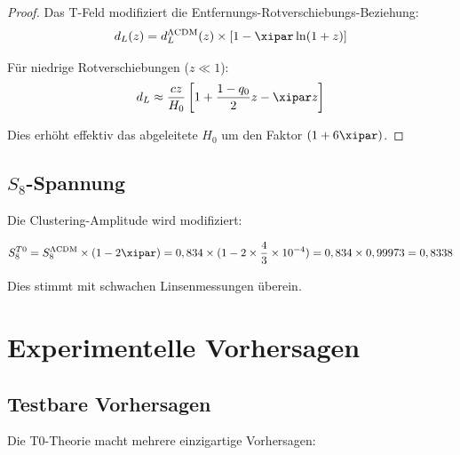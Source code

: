 	\begin{proof}
		Das T-Feld modifiziert die Entfernungs-Rotverschiebungs-Beziehung:
		\begin{equation}
			d_L(z) = d_L^{\Lambda\text{CDM}}(z) \times \left[1 - \xipar \ln(1+z)\right]
		\end{equation}
		
		Für niedrige Rotverschiebungen ($z \ll 1$):
		\begin{equation}
			d_L \approx \frac{cz}{H_0}\left[1 + \frac{1-q_0}{2}z - \xipar z\right]
		\end{equation}
		
		Dies erhöht effektiv das abgeleitete $H_0$ um den Faktor $(1 + 6\xipar)$.
	\end{proof}
	
	\subsection{$S_8$-Spannung}
	
	Die Clustering-Amplitude wird modifiziert:
	
	\begin{equation}
		S_8^{T0} = S_8^{\Lambda\text{CDM}} \times (1 - 2\xipar) = 0,834 \times (1 - 2 \times \frac{4}{3} \times 10^{-4}) = 0,834 \times 0,99973 = 0,8338
	\end{equation}
	
	Dies stimmt mit schwachen Linsenmessungen überein.
	
	\section{Experimentelle Vorhersagen}
	\label{sec:predictions}
	
	\subsection{Testbare Vorhersagen}
	
	Die T0-Theorie macht mehrere einzigartige Vorhersagen:
	
